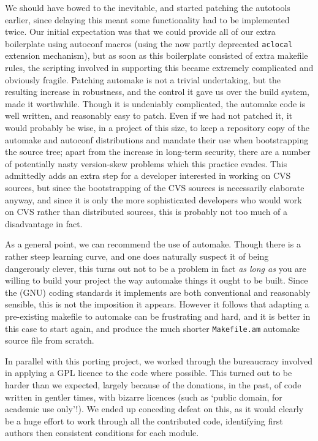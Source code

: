 \documentclass[11pt,twoside]{article}
\begin{document}
We should have bowed to the inevitable, and started patching the
autotools earlier, since delaying this meant some functionality had to be
implemented twice.  Our initial expectation was that we could provide
all of our extra boilerplate using autoconf macros (using the now
partly deprecated \texttt{aclocal} extension mechanism), but as soon as
this boilerplate consisted of extra makefile rules, the scripting
involved in supporting this became extremely complicated and obviously
fragile.  Patching automake is not a trivial undertaking, but the
resulting increase in robustness, and the control it gave us over the
build system, made it worthwhile.  Though it is undeniably
complicated, the automake code is well written, and reasonably easy to
patch.  Even if we had not patched it, it
would probably be wise, in a project of this size, to keep a
repository copy of the automake and autoconf distributions and mandate
their use when bootstrapping the source tree; apart from the increase
in long-term security, there are a number of potentially nasty
version-skew problems which this practice evades.  This admittedly adds
an extra step for a developer interested in working on CVS sources,
but since the bootstrapping of the CVS sources is necessarily
elaborate anyway, and since it is only the more sophisticated
developers who would work on CVS rather than distributed sources, this
is probably not too much of a disadvantage in fact.

As a general point, we can recommend the use of automake.  Though
there is a rather steep learning curve, and one does naturally suspect
it of being dangerously clever, this turns out not to be a problem in
fact \emph{as long as} you are willing to build your project the way
automake things it ought to be built.  Since the (GNU) coding
standards it implements are both conventional and reasonably sensible,
this is not the imposition it appears.  However it follows that
adapting a pre-existing makefile to automake can be frustrating and hard,
and it is better in this case to start again, and produce the much
shorter \texttt{Makefile.am} automake source file from scratch.

In parallel with this porting project, we worked through the
bureaucracy involved in applying a GPL licence to the code where
possible.  This turned out to be harder than we expected, largely
because of the donations, in the past, of code written in gentler
times, with bizarre licences (such as `public domain, for academic use
only'!).  We ended up conceding defeat on this, as it would clearly be
a huge effort to work through all the contributed code, identifying
first authors then consistent conditions for each module.
\end{document}
